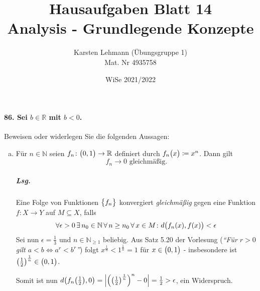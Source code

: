 \documentclass{scrreprt}
\author{Karsten Lehmann (Übungsgruppe 1)\\Mat. Nr 4935758}
\date{WiSe 2021/2022}
\title{Hausaufgaben Blatt 14\\Analysis - Grundlegende Konzepte}
\begin{document}
\paragraph{86. Sei $b \in \mathbb{R}$ mit $b < 0$.}
Beweisen oder widerlegen Sie die folgenden Aussagen:
\begin{enumerate}[(a)]
\item Für $n \in \mathbb{N}$ seien $f_n \colon \qty\big(0, 1) \to \mathbb{R}$
  definiert durch $f_n\qty\big(x) \coloneqq x^n$.
  Dann gilt
  \[
    f_n \to 0 \text{ gleichmäßig.}
  \]
  \subparagraph{Lsg.} Eine Folge von Funktionen $\qty\big{f_n}$ konvergiert
  \emph{gleichmäßig} gegen eine Funktion $f \colon X \to Y$ auf $M \subseteq X$,
  falls
  \[
    \forall \epsilon > 0 \,\exists\, n_0 \in \mathbb{N}
    \,\forall\, n \geq n_0 \,\forall\, x \in M \colon
    d\qty\big(f_n(x), f(x)) < \epsilon
  \]
  Sei nun $\epsilon = \frac{1}{3}$ und $n \in \mathbb{N}_{\geq 1}$ beliebig.
  Aus Satz 5.20 der Vorlesung
  (\emph{``Für $r > 0$ gilt $a < b \iff a^r < b^r$''}) folgt
  $x^{\frac{1}{n}} < 1^{\frac{1}{n}} = 1$ für $x \in \qty\big(0, 1)$
  - insbesondere ist $\qty(\frac{1}{2})^{\frac{1}{n}} \in \qty\big(0, 1)$.

  Somit ist nun $d\qty(f_n\qty(\frac{1}{2}), 0) =
  \abs{\qty(\qty(\frac{1}{2})^{\frac{1}{n}})^n - 0} = \frac{1}{2} > \epsilon$,
  ein Widerspruch.

\end{enumerate}
\end{document}
